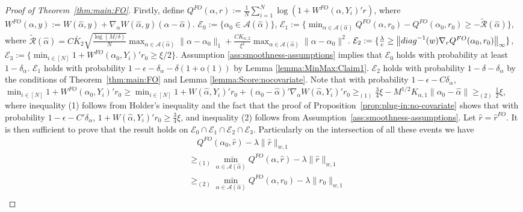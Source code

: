 \documentclass[11pt]{article}
\begin{document}
\begin{proof}[Proof of Theorem~\ref{thm:main:FO}]
Firstly, define 
$Q^{FO}(\alpha,r):= \frac{1}{N}\sum_{i=1}^N \log(1+ W^{FO}(\alpha,Y_i)'r)$, where $W^{FO}(\alpha,y):=W(\hat \alpha,y)+\nabla_\alpha W(\hat\alpha,y)(\alpha-\hat\alpha)$. $\mathcal{E}_0:= \{ \alpha_0 \in \mathcal{A}(\hat\alpha)\}$, $\mathcal{E}_1:= \{ \min_{\alpha \in \mathcal{A}(\hat\alpha)} Q^{FO}(\alpha,r_0)-Q^{FO}(\alpha_0,r_0) \geq - \widetilde{\mathcal{R}}(\hat\alpha) \}$, where $\widetilde{\mathcal{R}}(\hat\alpha)= C\bar{K}_2\sqrt{\frac{\log (M/\delta)}{N}}\max_{\alpha \in \mathcal{A}(\hat\alpha)}\|\alpha-\alpha_0\|_1+\frac{CK_{\alpha,2}}{\xi^2} \max_{\alpha \in \mathcal{A}(\hat\alpha)}\|\alpha - \alpha_0\|^2$. $\mathcal{E}_2:=\{\frac{\lambda}{c} \geq \left\|{\rm diag}^{-1}(w) \nabla_r Q^{FO}(\alpha_0,r_0)\right\|_\infty \}$, $\mathcal{E}_3:=\{\min_{i\in[N]} 1+W^{FO}(\alpha_0,Y_i)'r_0\geq\xi/2\}$. 
Assumption \ref{ass:smoothness-assumptions} implies that $\mathcal{E}_0$ holds with probability at least $1-\delta_\alpha$. $\mathcal{E}_1$ holds with probability $1-\epsilon-\delta_{\alpha}-\delta(1+\mathrm{o}(1))$ by Lemma \ref{lemma:MinMax:Claim1}. $\mathcal{E}_2$  holds with probability $1-\delta-\delta_{\alpha}$ by the conditions of Theorem~\ref{thm:main:FO} and Lemma \ref{lemma:Score:nocovariate}. Note that with probability $1-\epsilon-C\delta_{\alpha}$, 
$\min_{i\in[N]}1+W^{FO}(\alpha_0,Y_i)'r_0\geq\min_{i\in[N]}1+W(\hat{\alpha},Y_i)'r_0+(\alpha_0-\hat{\alpha})'\nabla_{\alpha}W(\hat{\alpha},Y_i)'r_0\geq_{(1)}\frac{3}{4}\xi-M^{1/2}K_{\alpha,1}\|\alpha_0-\hat{\alpha}\|\geq_{(2)}\frac{1}{2}\xi$, where inequality (1) follows from Holder's inequality and the fact that the proof of Proposition~\ref{prop:plug-in:no-covariate} shows that with probability $1-\epsilon-C'\delta_{\alpha}$, $1+W(\hat{\alpha},Y_i)'r_0\geq\frac{3}{4}\xi$, and inequality (2) follows from  Assumption~\ref{ass:smoothness-assumptions}. Let $\hat{r}=\hat{r}^{FO}$. It is then sufficient to prove that the result holds on $\mathcal{E}_0\cap\mathcal{E}_1\cap\mathcal{E}_2\cap\mathcal{E}_3$. Particularly on the intersection of all these events we have 
\begin{equation}\label{eq:main:steps}
\begin{array}{rl}
&\quad Q^{FO}(\alpha_0,\hat r) - \lambda \|\hat r\|_{w,1}\\
& \geq_{(1)} \displaystyle \min_{\alpha \in \mathcal{A}(\hat\alpha)} Q^{FO}(\alpha,\hat r) - \lambda \|\hat r\|_{w,1} \\
& \displaystyle  \geq_{(2)} \min_{\alpha \in \mathcal{A}(\hat\alpha)} Q^{FO}(\alpha,r_0) - \lambda \|r_0\|_{w,1}\\

\end{array}
\end{equation}
\end{proof}
\end{document}
